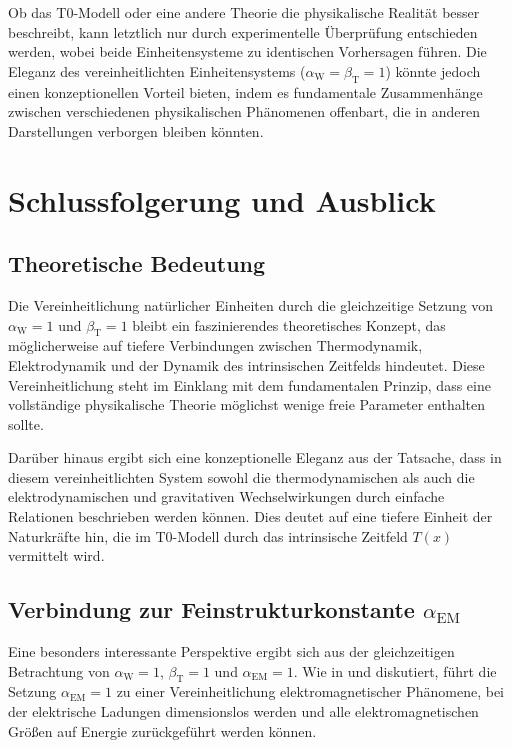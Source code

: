 \documentclass[12pt,a4paper]{article}
\newcommand{\Tfield}{T(x)}
\newcommand{\alphaEM}{\alpha_{\text{EM}}}
\newcommand{\betaT}{\beta_{\text{T}}}
\newcommand{\alphaW}{\alpha_{\text{W}}}
\begin{document}
Ob das T0-Modell oder eine andere Theorie die physikalische Realität besser beschreibt, kann letztlich nur durch experimentelle Überprüfung entschieden werden, wobei beide Einheitensysteme zu identischen Vorhersagen führen. Die Eleganz des vereinheitlichten Einheitensystems (\(\alphaW = \betaT = 1\)) könnte jedoch einen konzeptionellen Vorteil bieten, indem es fundamentale Zusammenhänge zwischen verschiedenen physikalischen Phänomenen offenbart, die in anderen Darstellungen verborgen bleiben könnten.

	\section{Schlussfolgerung und Ausblick}
	
	\subsection{Theoretische Bedeutung}
	
	Die Vereinheitlichung natürlicher Einheiten durch die gleichzeitige Setzung von \(\alphaW = 1\) und \(\betaT = 1\) bleibt ein faszinierendes theoretisches Konzept, das möglicherweise auf tiefere Verbindungen zwischen Thermodynamik, Elektrodynamik und der Dynamik des intrinsischen Zeitfelds hindeutet. Diese Vereinheitlichung steht im Einklang mit dem fundamentalen Prinzip, dass eine vollständige physikalische Theorie möglichst wenige freie Parameter enthalten sollte.
	
	Darüber hinaus ergibt sich eine konzeptionelle Eleganz aus der Tatsache, dass in diesem vereinheitlichten System sowohl die thermodynamischen als auch die elektrodynamischen und gravitativen Wechselwirkungen durch einfache Relationen beschrieben werden können. Dies deutet auf eine tiefere Einheit der Naturkräfte hin, die im T0-Modell durch das intrinsische Zeitfeld \(\Tfield\) vermittelt wird.
	
	\subsection{Verbindung zur Feinstrukturkonstante \(\alphaEM\)}
	
	Eine besonders interessante Perspektive ergibt sich aus der gleichzeitigen Betrachtung von \(\alphaW = 1\), \(\betaT = 1\) und \(\alphaEM = 1\). Wie in \cite{pascher_alpha_2025} und \cite{pascher_alphabeta_2025} diskutiert, führt die Setzung \(\alphaEM = 1\) zu einer Vereinheitlichung elektromagnetischer Phänomene, bei der elektrische Ladungen dimensionslos werden und alle elektromagnetischen Größen auf Energie zurückgeführt werden können.
	
\end{document}
